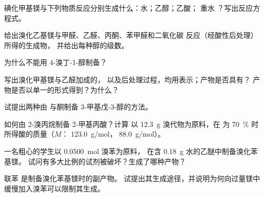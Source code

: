 \begin{exercise}[$\star$]\label{exo:b1:organomagnesium:2}
碘化甲基镁与下列物质反应分别生成什么：水；乙醇；乙酸；
重水 ？写出反应方程式。
\end{exercise}

\begin{exercise}[$\star$]\label{exo:b1:organomagnesium:3}
给出溴化乙基镁与甲醛、乙醛、丙酮、苯甲醛和二氧化碳
反应（经酸性后处理）所得的生成物，
并给出每种醇的级数。
\end{exercise}

\begin{exercise}[$\star$]\label{exo:b1:organomagnesium:4}
为什么不能用 4-溴丁-1-醇制备？
\end{exercise}

\begin{exercise}[$\star\star$]\label{exo:b1:organomagnesium:5}
写出溴化甲基镁与乙醛加成的，
以及后处理过程，均用表示；产物是否具有？
产物是否以单一的形式得到？为什么？
\end{exercise}

\begin{exercise}[$\star\star$]\label{exo:b1:organomagnesium:6}
试提出两种由
与酮制备 3-甲基戊-3-醇的方法。
\end{exercise}

\begin{exercise}[$\star\star$]\label{exo:b1:organomagnesium:7}
如何由 2-溴丙烷制备 2-甲基丙酸？计算
以 \qty{12.3}{g} 溴代物为原料，在
为 \qty{70}{\percent} 时所得酸的质量（$M$： \qty{123.0}{g/mol}，
\qty{88.0}{g/mol}）。
\end{exercise}

\begin{exercise}[$\star\star$]\label{exo:b1:organomagnesium:8}
一名粗心的学生以 \qty{0.0500}{mol} 溴苯为原料，
在含 \qty{0.18}{g} 水的乙醚中制备溴化苯基镁。
试问有多大比例的试剂被破坏？生成了哪种产物？
\end{exercise}

\begin{exercise}[$\star\star$]\label{exo:b1:organomagnesium:9}
联苯  是制备溴化苯基镁时的副产物。
试提出其生成途径，并说明为何向过量镁中
缓慢加入溴苯可以限制其生成。
\end{exercise}

